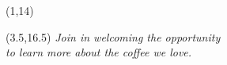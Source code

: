 \documentclass[a0,portrait]{a0poster}
\let\oldhuge\huge
\renewcommand{\normalsize}{\oldhuge}
\begin{document}
\begin{textblock}{13}(1,14)
\end{textblock}

\begin{textblock}{8}(3.5,16.5)
  \centering
  \normalsize
  \textit{
  Join \FLOW in welcoming the opportunity\\
  to learn more about the coffee we love. 
  }
  
\end{textblock}



\end{document}
